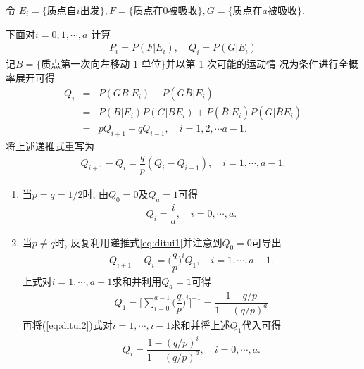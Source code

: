 \documentclass[Prob-All.tex]{subfiles}
\begin{document}
\begin{frame}
	\vspace{0.5cm}
	\hspace{-0.2cm}\jieda 令 $E_i=\{\mbox{质点自}i\mbox{出发}\}, F=\{\mbox{质点在}0\mbox{被吸收}\}, G=\{\mbox{质点在}a\mbox{被吸收}\}$. \pause

	下面对$i=0,1,\cdots,a$ 计算
	\begin{eqnarray*}
		P_i=P(F|E_i), \quad Q_i=P(G|E_i)
	\end{eqnarray*}
	\pause 记$B=\{\mbox{质点第一次向左移动 1 单位}\}$并以第 1 次可能的运动情
	况为条件进行全概率展开可得
	\begin{eqnarray*}
		Q_i&=&P(GB|E_i)+P(G\bar{B}|E_i)\\
		&=&P(B|E_i)P(G|BE_i)+P(\bar{B}|E_i)P(G|\bar{B}E_i)\\
		&=&pQ_{i+1}+qQ_{i-1}, \quad i=1,2,\cdots a-1.
	\end{eqnarray*}
	\pause 将上述递推式重写为
	\begin{eqnarray}\label{eq:ditui1}
		Q_{i+1}-Q_i=\dfrac{q}{p}(Q_i-Q_{i-1}), \quad i=1,\cdots, a-1.
	\end{eqnarray}

\end{frame}

\begin{frame}
	\vspace{0.5cm}
	\begin{enumerate}[<+-|alert@+>]
		\item 当$p=q=1/2$时, 由$Q_0=0$及$Q_a=1$可得
		\begin{eqnarray*}
			Q_i=\dfrac{i}{a},\quad  i=0,\cdots, a.
		\end{eqnarray*}
		\item 当$p\neq q$时, 反复利用递推式\eqref{eq:ditui1}并注意到$Q_0=0$可导出
		\begin{eqnarray}\label{eq:ditui2}
			Q_{i+1}-Q_i=\bigg(\dfrac{q}{p}\bigg)^iQ_1, \quad i=1,\cdots, a-1.
		\end{eqnarray}
		\pause 上式对$i=1,\cdots, a-1$求和并利用$Q_a=1$可得
		\begin{eqnarray*}
			Q_1=\bigg[\sum_{i=0}^{a-1}\bigg(\dfrac{q}{p}\bigg)^{i}\bigg]^{-1}=\dfrac{1-q/p}{1-(q/p)^a}
		\end{eqnarray*}
		\pause 再将(\ref{eq:ditui2})式对$i=1,\cdots, i-1$求和并将上述$Q_1$代入可得
		\begin{eqnarray*}
			Q_i=\dfrac{1-(q/p)^i}{1-(q/p)^a}, \quad i=0,\cdots, a.
		\end{eqnarray*}

	\end{enumerate}
\end{frame}
\end{document}
